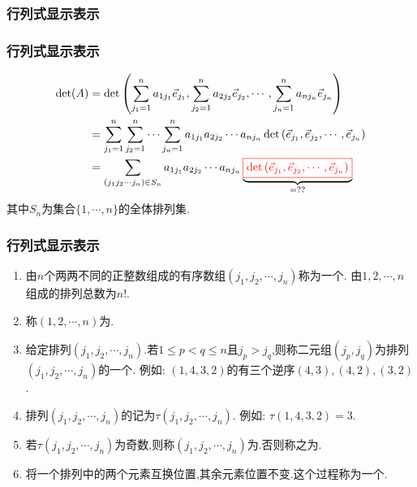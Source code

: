 \subsubsection{行列式显示表示}
\begin{frame}\frametitle{行列式显示表示}
\begin{equation*}
\begin{split}
\det(A)
& = \det\left(
\sum_{j_1=1}^{n}a_{1j_1}\vec{e}_{j_1}, \sum_{j_2=1}^{n}a_{2j_2}\vec{e}_{j_2},\cdots, \sum_{j_n=1}^{n}a_{nj_n}\vec{e}_{j_n}
\right)\\ \pp
& =\sum_{j_1=1}^{n}\sum_{j_2=1}^{n}\cdots \sum_{j_n=1}^{n} a_{1j_1}a_{2j_2}\cdots a_{nj_n}
\det\left(\vec{e}_{j_1}, \vec{e}_{j_2},\cdots, \vec{e}_{j_n}\right)\\ \pp
& =\sum_{(j_1j_2\cdots j_n)\in S_n} a_{1j_1}a_{2j_2}\cdots a_{nj_n}
\underbrace{\red{\boxed{\det\left(\vec{e}_{j_1}, \vec{e}_{j_2},\cdots, \vec{e}_{j_n}\right)}}}_{=??}\\
\end{split}
\end{equation*}
\pp
其中$S_n$为集合$\{1,\cdots,n\}$的全体排列集.
\end{frame}





\begin{frame}\frametitle{行列式显示表示}
\begin{definition}
\begin{enumerate}
\item 由$n$个两两不同的正整数组成的有序数组$(j_1,j_2,\cdots,j_n)$称为一个. \pp  由$1,2,\cdots,n$组成的排列总数为$n!$. \pp
\item 称$(1,2,\cdots,n)$为. \pp
\item 给定排列$(j_1,j_2,\cdots,j_n)$.若$1\leq p<q\leq n$且$j_p>j_q$,则称二元组$(j_p,j_q)$为排列$(j_1,j_2,\cdots,j_n)$的一个. \pp 例如: $(1,4,3,2)$的有三个逆序$(4,3),(4,2),(3,2)$. \pp
\item 排列$(j_1,j_2,\cdots,j_n)$的记为$\tau(j_1,j_2,\cdots,j_n)$. \pp  例如: $\tau(1,4,3,2)=3$. \pp
\item 若$\tau(j_1,j_2,\cdots,j_n)$为奇数,则称$(j_1,j_2,\cdots,j_n)$为.否则称之为. \pp
\item 将一个排列中的两个元素互换位置,其余元素位置不变.这个过程称为一个.
\end{enumerate}
\end{definition}
\end{frame}






